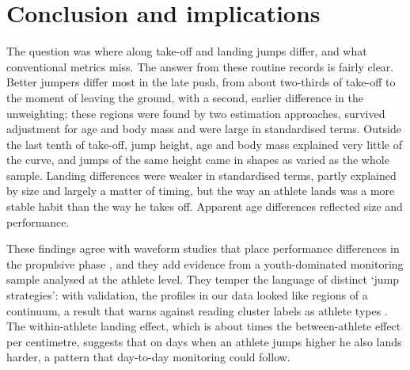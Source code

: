 \section{Conclusion and implications}
\label{sec:conclusion}

The question was where along take-off and landing jumps differ, and what conventional metrics miss. The answer from these routine records is fairly clear. Better jumpers differ most in the late push, from about two-thirds of take-off to the moment of leaving the ground, with a second, earlier difference in the unweighting; these regions were found by two estimation approaches, survived adjustment for age and body mass and were large in standardised terms. Outside the last tenth of take-off, jump height, age and body mass explained very little of the curve, and jumps of the same height came in shapes as varied as the whole sample. Landing differences were weaker in standardised terms, partly explained by size and largely a matter of timing, but the way an athlete lands was a more stable habit than the way he takes off. Apparent age differences reflected size and performance.

These findings agree with waveform studies that place performance differences in the propulsive phase \parencite{richter2014,floria2019}, and they add evidence from a youth-dominated monitoring sample analysed at the athlete level. They temper the language of distinct `jump strategies': with validation, the profiles in our data looked like regions of a continuum, a result that warns against reading cluster labels as athlete types \parencite{hennig2007}. The within-athlete landing effect, which is about \wiBwRatio{} times the between-athlete effect per centimetre, suggests that on days when an athlete jumps higher he also lands harder, a pattern that day-to-day monitoring could follow.

